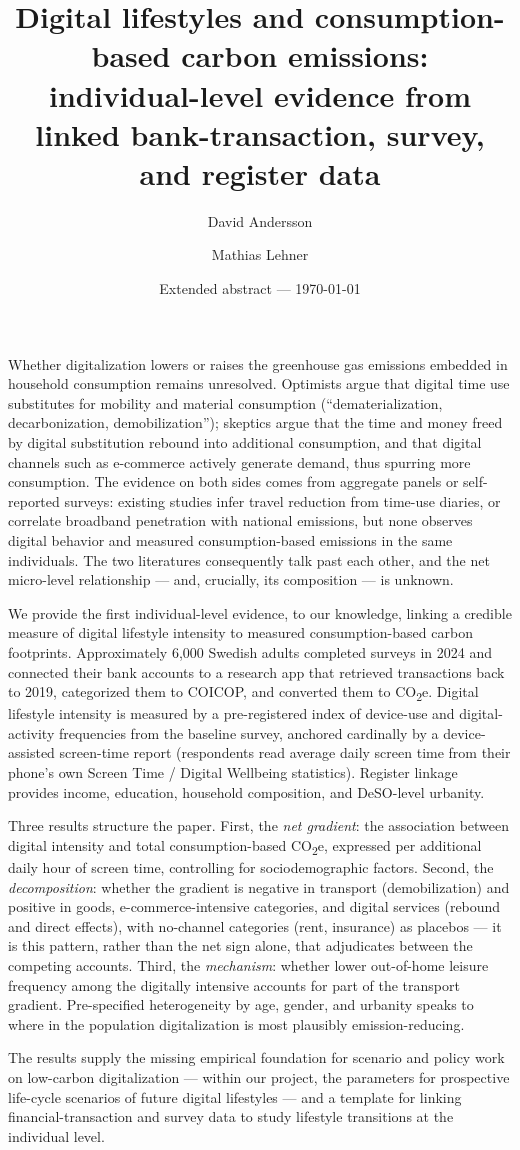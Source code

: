\documentclass[11pt,a4paper]{article}
\title{Digital lifestyles and consumption-based carbon emissions:\\
individual-level evidence from linked bank-transaction, survey, and register data}
\author{David Andersson \and Mathias Lehner%
}
\date{Extended abstract --- \today}
\begin{document}
\maketitle

\onehalfspacing

Whether digitalization lowers or raises the greenhouse gas emissions embedded in
household consumption remains unresolved. Optimists argue that digital time use
substitutes for mobility and material consumption (``dematerialization,
decarbonization, demobilization''); skeptics argue that the time and money freed by
digital substitution rebound into additional consumption, and that digital channels
such as e-commerce actively generate demand, thus spurring more consumption. The
evidence on both sides comes from aggregate panels or self-reported surveys:
existing studies infer travel reduction from time-use diaries, or correlate
broadband penetration with national emissions, but none observes digital behavior
and measured consumption-based emissions in the same individuals. The two
literatures consequently talk past each other, and the net micro-level relationship
--- and, crucially, its composition --- is unknown.

We provide the first individual-level evidence, to our knowledge, linking a
credible measure of digital lifestyle intensity to measured consumption-based
carbon footprints. Approximately 6{,}000 Swedish adults completed surveys in 2024 and
connected their bank accounts to a research app that retrieved transactions back to
2019, categorized them to COICOP, and converted them to CO\textsubscript{2}e. Digital lifestyle
intensity is measured by a pre-registered index of device-use and digital-activity
frequencies from the baseline survey, anchored cardinally by a device-assisted
screen-time report (respondents read average daily screen time from their phone's
own Screen Time / Digital Wellbeing statistics). Register linkage provides income,
education, household composition, and DeSO-level urbanity.

Three results structure the paper. First, the \emph{net gradient}: the association between
digital intensity and total consumption-based CO\textsubscript{2}e, expressed per additional daily
hour of screen time, controlling for sociodemographic factors. Second, the
\emph{decomposition}: whether the gradient is negative in transport (demobilization) and
positive in goods, e-commerce-intensive categories, and digital services (rebound
and direct effects), with no-channel categories (rent, insurance) as placebos ---
it is this pattern, rather than the net sign alone, that adjudicates between the
competing accounts. Third, the \emph{mechanism}: whether lower out-of-home leisure
frequency among the digitally intensive accounts for part of the transport
gradient. Pre-specified heterogeneity by age, gender, and urbanity speaks to where
in the population digitalization is most plausibly emission-reducing.

The results supply the missing empirical foundation for scenario and policy work on
low-carbon digitalization --- within our project, the parameters for prospective
life-cycle scenarios of future digital lifestyles --- and a template for linking
financial-transaction and survey data to study lifestyle transitions at the
individual level.
\end{document}

